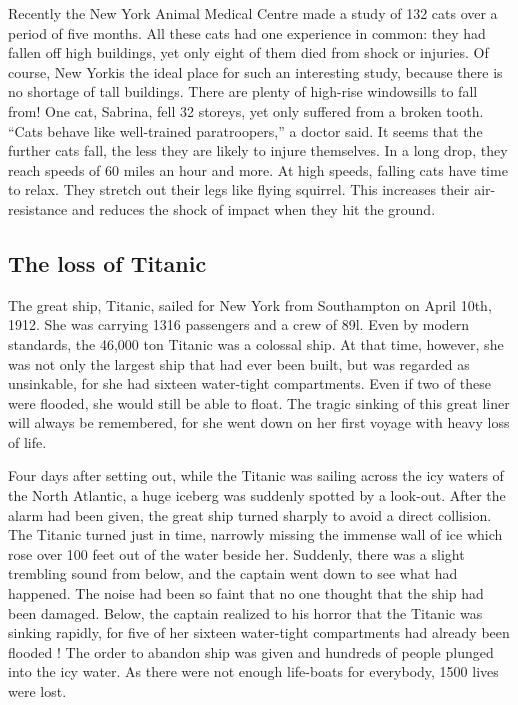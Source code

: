 \documentclass[11pt]{article}
\begin{document}
Recently the New York Animal Medical Centre made a study of 132 cats over a period of five months. All these cats had one experience in common: they had fallen off high buildings, yet only eight of them died from shock or injuries. Of course, New Yorkis the ideal place for such an interesting study, because there is no shortage of tall buildings. There are plenty of high-rise windowsills to fall from! One cat, Sabrina, fell 32 storeys, yet only suffered from a broken tooth. ``Cats behave like well-trained paratroopers,'' a doctor said. It seems that the further cats fall, the less they are likely to injure themselves. In a long drop, they reach speeds of 60 miles an hour and more. At high speeds, falling cats have time to relax. They stretch out their legs like flying squirrel. This increases their air-resistance and reduces the shock of impact when they hit the ground.
\subsection{The loss of Titanic}
\label{sec-1-10}

The great ship, Titanic, sailed for New York from Southampton on April 10th, 1912. She was carrying 1316 passengers and a crew of 89l. Even by modern standards, the 46,000 ton Titanic was a colossal ship. At that time, however, she was not only the largest ship that had ever been built, but was regarded as unsinkable, for she had sixteen water-tight compartments. Even if two of these were flooded, she would still be able to float. The tragic sinking of this great liner will always be remembered, for she went down on her first voyage with heavy loss of life.

Four days after setting out, while the Titanic was sailing across the icy waters of the North Atlantic, a huge iceberg was suddenly spotted by a look-out. After the alarm had been given, the great ship turned sharply to avoid a direct collision. The Titanic turned just in time, narrowly missing the immense wall of ice which rose over 100 feet out of the water beside her. Suddenly, there was a slight trembling sound from below, and the captain went down to see what had happened. The noise had been so faint that no one thought that the ship had been damaged. Below, the captain realized to his horror that the Titanic was sinking rapidly, for five of her sixteen water-tight compartments had already been flooded ! The order to abandon ship was given and hundreds of people plunged into the icy water. As there were not enough life-boats for everybody, 1500 lives were lost.
\end{document}

